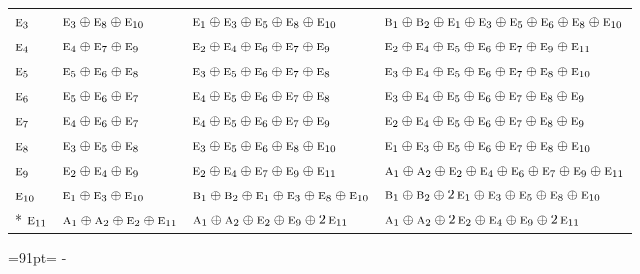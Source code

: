 \documentclass[10pt,a4paper]{article}
\newcommand{\needspace}[1]{\par\penalty-100\begingroup\dimen0=#1\relax\dimen2=\pagegoal
  \advance\dimen2-\pagetotal\ifdim\dimen0>\dimen2\relax\ifdim\dimen2>0pt\vfil\break\fi\fi
  \endgroup}
\numberwithin{equation}{section}
\newcommand{\irr}[1]{\text{\normalfont\scshape #1}}
\begin{document}
{\begin{longtable}{@{}llll@{}}
$\irr{e}_{3}$ & $\irr{e}_{3}\oplus \irr{e}_{8}\oplus \irr{e}_{10}$ & $\irr{e}_{1}\oplus \irr{e}_{3}\oplus \irr{e}_{5}\oplus \irr{e}_{8}\oplus \irr{e}_{10}$ & $\irr{b}_{1}\oplus \irr{b}_{2}\oplus \irr{e}_{1}\oplus \irr{e}_{3}\oplus \irr{e}_{5}\oplus \irr{e}_{6}\oplus \irr{e}_{8}\oplus \irr{e}_{10}$\\
$\irr{e}_{4}$ & $\irr{e}_{4}\oplus \irr{e}_{7}\oplus \irr{e}_{9}$ & $\irr{e}_{2}\oplus \irr{e}_{4}\oplus \irr{e}_{6}\oplus \irr{e}_{7}\oplus \irr{e}_{9}$ & $\irr{e}_{2}\oplus \irr{e}_{4}\oplus \irr{e}_{5}\oplus \irr{e}_{6}\oplus \irr{e}_{7}\oplus \irr{e}_{9}\oplus \irr{e}_{11}$\\
$\irr{e}_{5}$ & $\irr{e}_{5}\oplus \irr{e}_{6}\oplus \irr{e}_{8}$ & $\irr{e}_{3}\oplus \irr{e}_{5}\oplus \irr{e}_{6}\oplus \irr{e}_{7}\oplus \irr{e}_{8}$ & $\irr{e}_{3}\oplus \irr{e}_{4}\oplus \irr{e}_{5}\oplus \irr{e}_{6}\oplus \irr{e}_{7}\oplus \irr{e}_{8}\oplus \irr{e}_{10}$\\
$\irr{e}_{6}$ & $\irr{e}_{5}\oplus \irr{e}_{6}\oplus \irr{e}_{7}$ & $\irr{e}_{4}\oplus \irr{e}_{5}\oplus \irr{e}_{6}\oplus \irr{e}_{7}\oplus \irr{e}_{8}$ & $\irr{e}_{3}\oplus \irr{e}_{4}\oplus \irr{e}_{5}\oplus \irr{e}_{6}\oplus \irr{e}_{7}\oplus \irr{e}_{8}\oplus \irr{e}_{9}$\\
$\irr{e}_{7}$ & $\irr{e}_{4}\oplus \irr{e}_{6}\oplus \irr{e}_{7}$ & $\irr{e}_{4}\oplus \irr{e}_{5}\oplus \irr{e}_{6}\oplus \irr{e}_{7}\oplus \irr{e}_{9}$ & $\irr{e}_{2}\oplus \irr{e}_{4}\oplus \irr{e}_{5}\oplus \irr{e}_{6}\oplus \irr{e}_{7}\oplus \irr{e}_{8}\oplus \irr{e}_{9}$\\
$\irr{e}_{8}$ & $\irr{e}_{3}\oplus \irr{e}_{5}\oplus \irr{e}_{8}$ & $\irr{e}_{3}\oplus \irr{e}_{5}\oplus \irr{e}_{6}\oplus \irr{e}_{8}\oplus \irr{e}_{10}$ & $\irr{e}_{1}\oplus \irr{e}_{3}\oplus \irr{e}_{5}\oplus \irr{e}_{6}\oplus \irr{e}_{7}\oplus \irr{e}_{8}\oplus \irr{e}_{10}$\\
$\irr{e}_{9}$ & $\irr{e}_{2}\oplus \irr{e}_{4}\oplus \irr{e}_{9}$ & $\irr{e}_{2}\oplus \irr{e}_{4}\oplus \irr{e}_{7}\oplus \irr{e}_{9}\oplus \irr{e}_{11}$ & $\irr{a}_{1}\oplus \irr{a}_{2}\oplus \irr{e}_{2}\oplus \irr{e}_{4}\oplus \irr{e}_{6}\oplus \irr{e}_{7}\oplus \irr{e}_{9}\oplus \irr{e}_{11}$\\
$\irr{e}_{10}$ & $\irr{e}_{1}\oplus \irr{e}_{3}\oplus \irr{e}_{10}$ & $\irr{b}_{1}\oplus \irr{b}_{2}\oplus \irr{e}_{1}\oplus \irr{e}_{3}\oplus \irr{e}_{8}\oplus \irr{e}_{10}$ & $\irr{b}_{1}\oplus \irr{b}_{2}\oplus 2\,\irr{e}_{1}\oplus \irr{e}_{3}\oplus \irr{e}_{5}\oplus \irr{e}_{8}\oplus \irr{e}_{10}$\\*
$\irr{e}_{11}$ & $\irr{a}_{1}\oplus \irr{a}_{2}\oplus \irr{e}_{2}\oplus \irr{e}_{11}$ & $\irr{a}_{1}\oplus \irr{a}_{2}\oplus \irr{e}_{2}\oplus \irr{e}_{9}\oplus 2\,\irr{e}_{11}$ & $\irr{a}_{1}\oplus \irr{a}_{2}\oplus 2\,\irr{e}_{2}\oplus \irr{e}_{4}\oplus \irr{e}_{9}\oplus 2\,\irr{e}_{11}$\\
\bottomrule\end{longtable}}
\needspace{91pt}
\end{document}
